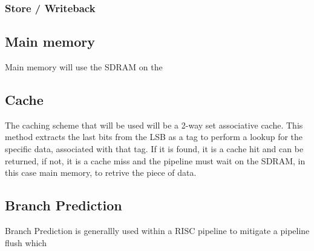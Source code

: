 \documentclass[11pt]{article}
\begin{document}
\subsubsection{Store / Writeback}
\label{sec-3-1-4}


\subsection{Main memory}
\label{sec-3-2}
Main memory will use the SDRAM on the 

\subsection{Cache}
\label{sec-3-3}
The caching scheme that will be used will be a 2-way set associative cache. This method extracts the last bits from the LSB as a tag to perform a lookup for the specific data, associated with that tag. If it is found, it is a cache hit and can be returned, if not, it is a cache miss and the pipeline must wait on the SDRAM, in this case main memory, to retrive the piece of data.

\subsection{Branch Prediction}
\label{sec-3-4}
Branch Prediction is generallly used within a RISC pipeline to mitigate a pipeline flush which 
\end{document}
